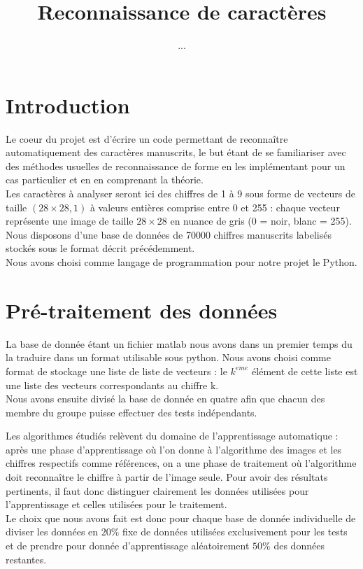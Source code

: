 \documentclass[a4paper,11pt,twoside]{report}
\author{...}
\title{Reconnaissance de caractères}
\begin{document}
 
\maketitle 



\chapter{Introduction}
Le coeur du projet est d'écrire un code permettant de reconnaître automatiquement des caractères manuscrits, le but étant de se familiariser avec des méthodes usuelles de reconnaissance de forme en les implémentant pour un cas particulier et en en comprenant la théorie. \\


Les caractères à analyser seront ici des chiffres de 1 à 9 sous forme de vecteurs de taille $(28\times28,1)$ à valeurs entières comprise entre 0 et 255 : chaque vecteur représente une image de taille $28\times28$ en nuance de gris (0 = noir, blanc = 255). Nous disposons d'une base de données de 70000 chiffres manuscrits labelisés stockés sous le format décrit précédemment.\\
 
Nous avons choisi comme langage de programmation pour notre projet le Python.

\chapter{Pré-traitement des données}
La base de donnée étant un fichier matlab nous avons dans un premier temps du la traduire dans un format utilisable sous python. Nous avons choisi comme format de stockage une liste de liste de vecteurs : le $k^{eme}$ élément de cette liste est une liste des vecteurs correspondants au chiffre k.\\
Nous avons ensuite divisé la base de donnée en quatre afin que chacun des membre du groupe puisse effectuer des tests indépendants. 

Les algorithmes étudiés relèvent du domaine de l'apprentissage automatique : après une phase d'apprentissage où l'on donne à l'algorithme des images et les chiffres respectifs comme références, on a une phase de traitement où l'algorithme doit reconnaître le chiffre à partir de l'image seule. Pour avoir des résultats pertinents, il faut donc distinguer clairement les données utilisées pour l'apprentissage et celles utilisées pour le traitement.\\Le choix que nous avons fait est donc pour chaque base de donnée individuelle de diviser les données en $20\%$ fixe de données utilisées exclusivement pour les tests et de prendre pour donnée d'apprentissage aléatoirement $50\%$ des données restantes.
\end{document}
